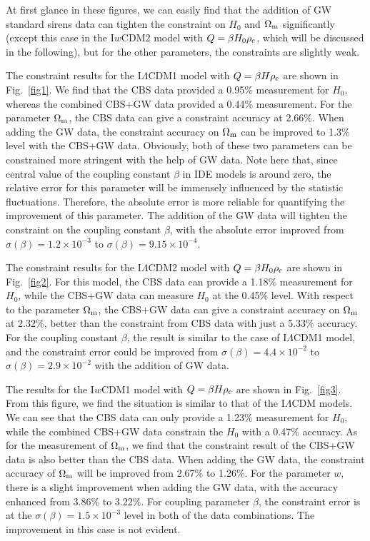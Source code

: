 \documentclass[aps,prd,nofootinbib,amsmath,amssymb,superscriptaddress,twocolumn,10pt]{revtex4}%
\newcommand{\red}{\textcolor[rgb]{1.00,0.00,0.00}}
\begin{document}
At first glance in these figures, we can easily find that the addition of GW standard sirens data can tighten the constraint on $H_0$ and $\Omega_{\rm m}$ significantly (except this case in the I$w$CDM2 model with $Q=\beta H_{0}\rho_{\rm c}$, which will be discussed in the following), but for the other parameters, the constraints are slightly weak.


The constraint results for the I$\Lambda$CDM1 model with $Q=\beta H\rho_{\rm c}$ are shown in Fig.~\ref{fig1}. We find that the CBS data provided a 0.95\% measurement for $H_0$, whereas the combined CBS+GW data provided a 0.44\% measurement. For the parameter $\Omega_{\rm m}$, the CBS data can give a constraint accuracy at 2.66\%. When adding the GW data, the constraint accuracy on $\Omega_{\rm m}$ can be improved to 1.3\% level with the CBS+GW data. Obviously, both of these two parameters can be constrained more stringent with the help of GW data. \red{Note here that, since central value of the coupling constant $\beta$ in IDE models is around zero, the relative error for this parameter will be immensely influenced by the statistic fluctuations. Therefore, the absolute error is more reliable for quantifying the improvement of this parameter. The addition of the GW data will tighten the constraint on the coupling constant $\beta$, with the absolute error improved from $\sigma(\beta)=1.2 \times 10^{-3}$ to $\sigma(\beta)=9.15 \times 10^{-4}$.}


The constraint results for the I$\Lambda$CDM2 model with $Q=\beta H_{0}\rho_{\rm c}$ are shown in Fig.~\ref{fig2}. For this model, the CBS data can provide a 1.18\% measurement for $H_0$,  while the CBS+GW data can measure $H_0$ at the 0.45\% level. With respect to the parameter $\Omega_{\rm m}$, the CBS+GW data can give a constraint accuracy on $\Omega_{\rm m}$ at 2.32\%, better than the constraint from CBS data with just a 5.33\% accuracy. \red{For the coupling constant $\beta$, the result is similar to the case of I$\Lambda$CDM1 model, and the constraint error could be improved  from $\sigma(\beta)=4.4 \times 10^{-2}$ to $\sigma(\beta)=2.9 \times 10^{-2}$ with the addition of GW data.}

The results for the I$w$CDM1 model with $Q=\beta H\rho_{\rm c}$ are shown in Fig.~\ref{fig3}. From this figure, we find the situation is similar to that of the I$\Lambda$CDM models. We can see that the CBS data can only provide a 1.23\% measurement for $H_0$, while the combined CBS+GW data constrain the $H_0$ with a 0.47\% accuracy. As for the measurement of $\Omega_{\rm m}$, we find that the constraint result of the CBS+GW data is also better than the CBS data. When adding the GW data, the constraint accuracy of $\Omega_{\rm m}$ will be improved from 2.67\% to 1.26\%. For the parameter $w$, there is a slight improvement when adding the GW data, with the accuracy enhanced from 3.86\% to 3.22\%. \red{For coupling parameter $\beta$, the constraint error is at the $\sigma(\beta)=1.5 \times 10^{-3}$ level in both of the data combinations. The improvement in this case is not evident.}
\end{document}
